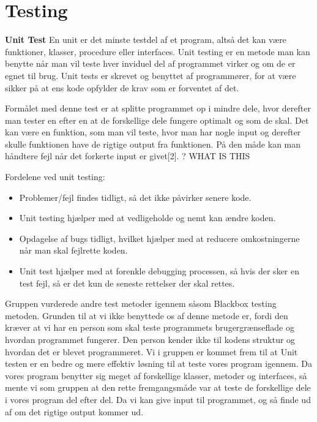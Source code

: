 \section{Testing}\label{Testing}

\textbf{Unit Test} \newline
En unit er det minste testdel af et program, altså det kan være funktioner, klasser, procedure eller interfaces. Unit testing er en metode man kan benytte når man vil teste hver inviduel del af programmet virker og om de er egnet til brug. Unit tests er skrevet og benyttet af programmører, for at være sikker på at ens kode opfylder de krav som er forventet af det. 

\vspace {5mm}

Formålet med denne test er at splitte programmet op i mindre dele, hvor derefter man tester en efter en at de forskellige dele fungere optimalt og som de skal. Det kan være en funktion, som man vil teste, hvor man har nogle input og derefter skulle funktionen have de rigtige output fra funktionen. På den måde kan man håndtere fejl når det forkerte input er givet[2]. ? WHAT IS THIS

Fordelene ved unit testing:
\begin{itemize}
\item Problemer/fejl findes tidligt, så det ikke påvirker senere kode.
\item Unit testing hjælper med at vedligeholde og nemt kan ændre koden.
\item Opdagelse af bugs tidligt, hvilket hjælper med at reducere omkostningerne når man skal fejlrette koden.
\item Unit test hjælper med at forenkle debugging processen, så hvis der sker en test fejl, så er det kun de seneste rettelser der skal rettes.
\end{itemize}\cite{unittestbenefits}

Gruppen vurderede andre test metoder igennem såsom Blackbox testing metoden. Grunden til at vi ikke benyttede os af denne metode er, fordi den kræver at vi har en person som skal teste programmets brugergrænseflade og hvordan programmet fungerer. Den person kender ikke til kodens struktur og hvordan det er blevet programmeret. Vi i gruppen er kommet frem til at Unit testen er en bedre og mere effektiv løsning til at teste vores program igennem. Da vores program benytter sig meget af forskellige klasser, metoder og interfaces, så mente vi som gruppen at den rette fremgangsmåde var at teste de forskellige dele i vores program del efter del. Da vi kan give input til programmet, og så finde ud af om det rigtige output kommer ud.
